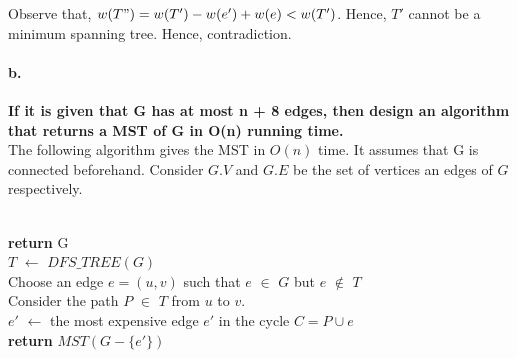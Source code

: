 \documentclass[a4paper]{article}
\begin{document}
Observe that, $w(T") = w(T') - w(e') + w(e) < w(T')$. Hence, $T'$ cannot be a minimum spanning tree. Hence, contradiction. 
\paragraph{b.}\textbf{If it is given that G has at most n + 8 edges, then design an algorithm that returns a MST of G in O(n) running time.} \\
The following algorithm gives the MST in $O(n)$ time. It assumes that G is connected beforehand. Consider $G.V$ and $G.E$ be the set of vertices an edges of $G$ respectively. \\
\begin{algorithm}[H]
\caption {$MST(G)$}
\begin{algorithmic}
\\
      \textbf{return} G
\Else \\
$T$ $\gets$  $DFS\_TREE(G)$ \\
Choose an edge $e=(u,v)$ such that $e$ $\in$ $G$ but $e$ $\notin$ $T$ \\
Consider the path $P$ $\in$ $T$ from $u$ to $v$. \\
$e'$ $\gets$ the most expensive edge $e'$ in the cycle $C = P \cup e$  \\
\textbf{return} $MST(G - \{e'\})$ 
\EndIf
\end{algorithmic}
\end{algorithm}
\end{document}
